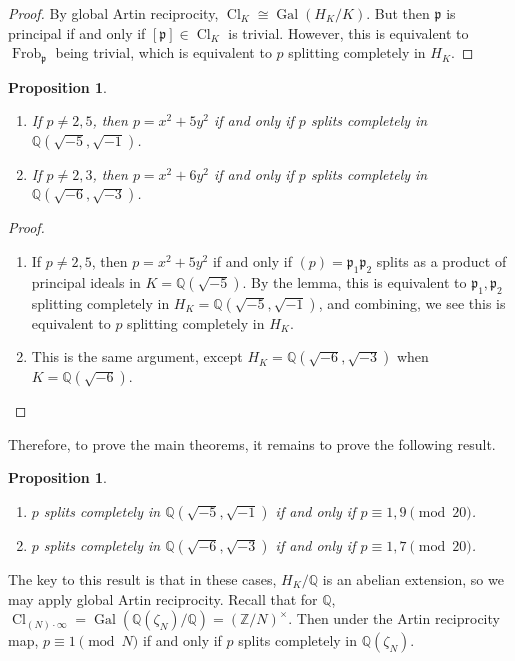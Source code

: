 \documentclass[leqno, openany]{memoir}
\newtheorem{prop}[thm]{Proposition}
\theoremstyle{definition}
\theoremstyle{remark}
\theoremstyle{plain}
\theoremstyle{definition}
\theoremstyle{remark}
\newcommand{\Z}{\mathbb{Z}}
\newcommand{\Q}{\mathbb{Q}}
\newcommand{\mf}[1]{\mathfrak{#1}}
\DeclareMathOperator{\Gal}{Gal}
\DeclareMathOperator{\Cl}{Cl}
\DeclareMathOperator{\Frob}{Frob}
\begin{document}
\begin{proof}
    By global Artin reciprocity, $\Cl_K \cong \Gal(H_K/K)$. But then $\mf{p}$ is principal if and only if $[\mf{p}] \in \Cl_K$ is trivial. However, this is equivalent to $\Frob_{\mf{p}}$ being trivial, which is equivalent to $p$ splitting completely in $H_K$.
\end{proof}

\begin{prop}\leavevmode
    \begin{enumerate}
        \item If $p \neq 2,5$, then $p = x^2 + 5y^2$ if and only if $p$ splits completely in $\Q(\sqrt{-5}, \sqrt{-1})$.
        \item If $p \neq 2,3$, then $p = x^2 + 6y^2$ if and only if $p$ splits completely in $\Q(\sqrt{-6}, \sqrt{-3})$.
    \end{enumerate}
\end{prop}

\begin{proof}\leavevmode
    \begin{enumerate}
        \item If $p \neq 2,5$, then $p = x^2 + 5y^2$ if and only if $(p) = \mf{p}_1 \mf{p}_2$ splits as a product of principal ideals in $K = \Q(\sqrt{-5})$. By the lemma, this is equivalent to $\mf{p}_1, \mf{p}_2$ splitting completely in $H_K = \Q(\sqrt{-5}, \sqrt{-1})$, and combining, we see this is equivalent to $p$ splitting completely in $H_K$.
        \item This is the same argument, except $H_K = \Q(\sqrt{-6}, \sqrt{-3})$ when $K = \Q(\sqrt{-6})$. \qedhere
    \end{enumerate}
\end{proof}

Therefore, to prove the main theorems, it remains to prove the following result.
\begin{prop}\leavevmode
    \begin{enumerate}
        \item $p$ splits completely in $\Q(\sqrt{-5}, \sqrt{-1})$ if and only if $p \equiv 1,9 \pmod{20}$.
        \item $p$ splits completely in $\Q(\sqrt{-6}, \sqrt{-3})$ if and only if $p \equiv 1,7 \pmod{20}$.
    \end{enumerate}
\end{prop}

The key to this result is that in these cases, $H_K/\Q$ is an abelian extension, so we may apply global Artin reciprocity. Recall that for $\Q$, $\Cl_{(N) \cdot \infty} = \Gal(\Q(\zeta_N) / \Q) = {(\Z/N)}^{\times}$. Then under the Artin reciprocity map, $p \equiv 1 \pmod N$ if and only if $p$ splits completely in $\Q(\zeta_N)$.
\end{document}
